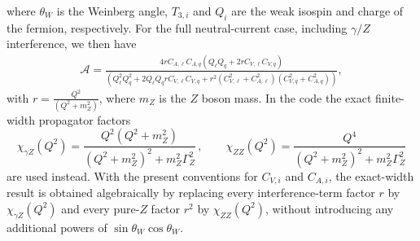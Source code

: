 \documentclass[a4paper,11pt]{article}
\begin{document}
where $\theta_W$ is the Weinberg angle, $T_{3,i}$ and $Q_i$ are the
weak isospin and charge of the fermion, respectively. For the full
neutral-current case, including $\gamma/Z$ interference, we then have
\begin{align}\label{eq:Aunpol}
\mathcal{A} = \frac{4 r C_{A,\ell} C_{A,q} \left(Q_\ell Q_q+2rC_{V,\ell}C_{V,q} \right)}
{\left(Q_\ell^2Q_q^2+2Q_\ell Q_q rC_{V,\ell}C_{V,q}
+r^2\left(C^2_{V,\ell}+C^2_{A,\ell}\right)\left(C^2_{V,q   }+C^2_{A,q   }\right)\right)},
\end{align}
with $r=\frac{Q^2}{(Q^2+m^2_Z)}$, where $m_Z$ is the $Z$ boson mass. In the code the exact finite-width propagator factors
\begin{equation}
  \chi_{\gamma Z}(Q^2)=\frac{Q^2(Q^2+m_Z^2)}{(Q^2+m_Z^2)^2+m_Z^2\Gamma_Z^2}\,,
  \qquad
  \chi_{ZZ}(Q^2)=\frac{Q^4}{(Q^2+m_Z^2)^2+m_Z^2\Gamma_Z^2}
\end{equation}
are used instead. With the present conventions for $C_{V,i}$ and $C_{A,i}$, the exact-width result is obtained algebraically by replacing every interference-term factor $r$ by $\chi_{\gamma Z}(Q^2)$ and every pure-$Z$ factor $r^2$ by $\chi_{ZZ}(Q^2)$, without introducing any additional powers of $\sin\theta_W\cos\theta_W$.
\end{document}
